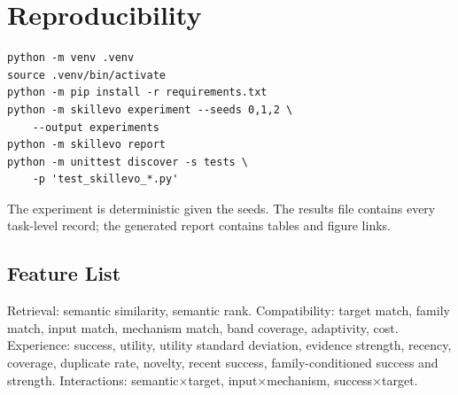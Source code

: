 \documentclass[journal]{IEEEtran}
\begin{document}
\appendices
\section{Reproducibility}

\begin{verbatim}
python -m venv .venv
source .venv/bin/activate
python -m pip install -r requirements.txt
python -m skillevo experiment --seeds 0,1,2 \
    --output experiments
python -m skillevo report
python -m unittest discover -s tests \
    -p 'test_skillevo_*.py'
\end{verbatim}

The experiment is deterministic given the seeds. The results file contains every task-level record; the generated report contains tables and figure links.

\subsection{Feature List}

Retrieval: semantic similarity, semantic rank. Compatibility: target match, family match, input match, mechanism match, band coverage, adaptivity, cost. Experience: success, utility, utility standard deviation, evidence strength, recency, coverage, duplicate rate, novelty, recent success, family-conditioned success and strength. Interactions: semantic$\times$target, input$\times$mechanism, success$\times$target.



\end{document}
